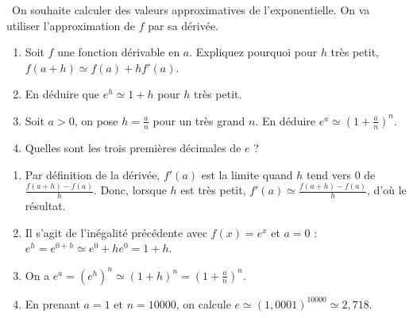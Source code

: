 \documentclass[a4paper,12pt]{exam}
\begin{document}
\begin{questions}
\question\ 
On souhaite calculer des valeurs approximatives de l'exponentielle.
On va utiliser l'approximation de $f$ par sa dérivée.
 \begin{enumerate}
 \item Soit $f$ une fonction dérivable en $a$. Expliquez pourquoi pour $h$ très petit, $f(a+h)\simeq f(a)+hf'(a)$.
 \item En déduire que $e^h\simeq 1+h$ pour $h$ très petit.
 \item Soit $a>0$, on pose $h=\tfrac{a}{n}$ pour un très grand $n$. En déduire $e^a\simeq(1+\tfrac{a}{n})^n$.
 \item Quelles sont les trois premières décimales de $e$ ?
\end{enumerate}

\begin{solution}
 \begin{enumerate}
  \item Par définition de la dérivée, $f'(a)$ est la limite quand $h$ tend vers $0$ de $\tfrac{f(a+h)-f(a)}{h}$. Donc, lorsque $h$ est très petit, $f'(a)\simeq\tfrac{f(a+h)-f(a)}{h}$, d'où le résultat.
  \item Il s'agit de l'inégalité précédente avec $f(x)=e^x$ et $a=0$ : $e^h=e^{0+h}\simeq e^0+he^{0}=1+h$.
  \item On a $e^a=(e^h)^n\simeq(1+h)^n=(1+\tfrac{a}{n})^n$.
  \item En prenant $a=1$ et $n=10000$, on calcule $e\simeq(1{,}0001)^10000\simeq2{,}718$.
 \end{enumerate}
\end{solution}



\end{questions}
\end{document}
